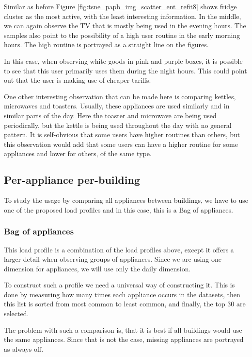 Similar as before Figure \ref{fig:tsne_papb_img_scatter_ent_refit8} shows fridge cluster as the most active,
with the least interesting information. In the middle, we can again observe the TV that is mostly being used
in the evening hours. The samples also point to the possibility of a high user routine in the early morning hours.
The high routine is portrayed as a straight line on the figures. 

In this case, when observing white goods in pink and purple boxes, it is possible to see that this user primarily uses them during the night hours.
This could point out that the user is making use of cheaper tariffs.

One other interesting observation that can be made here is comparing kettles, microwaves and toasters.
Usually, these appliances are used similarly and in similar parts of the day. 
Here the toaster and microwave are being used periodically, but the kettle is being used throughout the day with no general pattern.
It is self-obvious that some users have higher routines than others, but this observation
would add that some users can have a higher routine for some appliances and lower for others, of the same type. 

\subsection{Per-appliance per-building}

To study the usage by comparing all appliances between buildings,
we have to use one of the proposed load profiles and in this case, this is a Bag of appliances.

\subsubsection{Bag of appliances}
This load profile is a combination of the load profiles above,
except it offers a larger detail when observing groups of appliances.
Since we are using one dimension for appliances, we will use only the daily dimension.

To construct such a profile we need a universal way of constructing it.
This is done by measuring how many times each appliance occurs in the datasets,
then this list is sorted from most common to least common, and finally, the top 30 are selected.

The problem with such a comparison is, that it is best 
if all buildings would use the same appliances.
Since that is not the case, missing appliances are portrayed as always off. 

